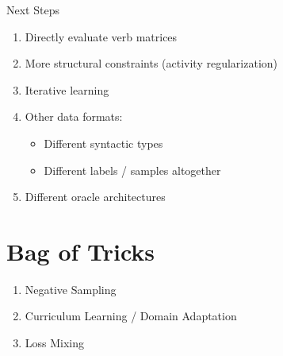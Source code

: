 \documentclass{beamer}
\begin{document}
\begin{frame}{Next Steps}
\begin{enumerate}
\item Directly evaluate verb matrices
\item More structural constraints (activity regularization)
\item Iterative learning
\item Other data formats:
\begin{itemize}
\item Different syntactic types
\item Different labels / samples altogether
\end{itemize}
\item Different oracle architectures
\end{enumerate}
\end{frame}

\section{Bag of Tricks}
\begin{frame}
\begin{enumerate}
\item Negative Sampling
\item Curriculum Learning / Domain Adaptation
\item Loss Mixing
\end{enumerate}
\end{frame}
\end{document}
